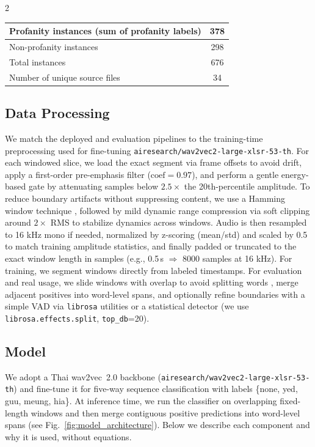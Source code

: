 \documentclass[11pt,a4paper]{article}
\newenvironment{Table}
   {\par\bigskip\noindent\minipage{\columnwidth}\centering}
   {\endminipage\par\bigskip}
\begin{document}
\begin{multicols}{2}
\begin{Table}
\small
\begin{tabularx}{\columnwidth}{|>{\raggedright\arraybackslash}X|c|}
\hline
Profanity instances (sum of profanity labels) & 378 \\ \hline
Non-profanity instances & 298 \\ \hline
Total instances & 676 \\ \hline
Number of unique source files & 34 \\ \hline
\end{tabularx}
\end{Table}

\subsection{Data Processing}
We match the deployed and evaluation pipelines to the training-time preprocessing used for fine-tuning \texttt{airesearch/wav2vec2-large-xlsr-53-th}. For each windowed slice, we load the exact segment via frame offsets to avoid drift, apply a first-order pre-emphasis filter ($\mathrm{coef}=0.97$), and perform a gentle energy-based gate by attenuating samples below $2.5\times$ the 20th-percentile amplitude. To reduce boundary artifacts without suppressing content, we use a Hamming window technique \cite{harris1978windows,allen1977shorttime,shrawankar2013adaptivemethodologyubiquitousasr}, followed by mild dynamic range compression via soft clipping around $2\times$ RMS to stabilize dynamics across windows. Audio is then resampled to 16 kHz mono if needed, normalized by z-scoring (mean/std) and scaled by 0.5 to match training amplitude statistics, and finally padded or truncated to the exact window length in samples (e.g., 0.5\,s $\Rightarrow$ 8000 samples at 16 kHz). For training, we segment windows directly from labeled timestamps. For evaluation and real usage, we slide windows with overlap to avoid splitting words \cite{9900333}, merge adjacent positives into word-level spans, and optionally refine boundaries with a simple VAD via \texttt{librosa} utilities \cite{mcfee2015librosa} or a statistical detector \cite{sohn1999vad} (we use \texttt{librosa.effects.split}, \texttt{top\_db}=20).

\subsection{Model}
We adopt a Thai wav2vec~2.0 backbone (\texttt{airesearch/wav2vec2-large-xlsr-53-th}) \cite{baevski2020wav2vec20frameworkselfsupervised} and fine-tune it for five-way sequence classification with labels \{none, yed, guu, meung, hia\}. At inference time, we run the classifier on overlapping fixed-length windows and then merge contiguous positive predictions into word-level spans (see Fig.~\ref{fig:model_architecture}). Below we describe each component and why it is used, without equations.



\end{multicols}
\end{document}

